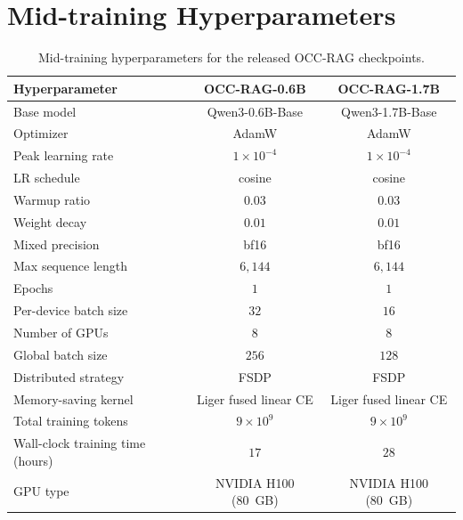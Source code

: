 \documentclass{llmxive}
\begin{document}


% 

% 
\section{Mid-training Hyperparameters}
\label{appendix:training-hyperparameters}
\begin{table}[!htbp]
\centering
\small
\begin{tabular}{lcc}
\toprule
\textbf{Hyperparameter} & \textbf{OCC-RAG-0.6B} & \textbf{OCC-RAG-1.7B} \\
\midrule
Base model              & Qwen3-0.6B-Base   & Qwen3-1.7B-Base   \\
Optimizer               & AdamW             & AdamW             \\
Peak learning rate      & $1\times10^{-4}$  & $1\times10^{-4}$  \\
LR schedule             & cosine            & cosine            \\
Warmup ratio            & $0.03$            & $0.03$            \\
Weight decay            & $0.01$            & $0.01$            \\
Mixed precision         & bf16              & bf16              \\
Max sequence length     & $6{,}144$         & $6{,}144$         \\
Epochs                  & $1$               & $1$               \\
Per-device batch size   & $32$              & $16$              \\
Number of GPUs          & $8$               & $8$               \\
Global batch size       & $256$             & $128$             \\
Distributed strategy    & FSDP              & FSDP              \\
Memory-saving kernel    & Liger fused linear CE & Liger fused linear CE \\
Total training tokens   & $9\times10^9$     & $9\times10^9$               \\
Wall-clock training time (hours) & $17$              & $28$               \\
GPU type                & NVIDIA H100 (80~GB) & NVIDIA H100 (80~GB)               \\
\bottomrule
\end{tabular}
\caption{Mid-training hyperparameters for the released OCC-RAG checkpoints.}
\label{tab:training-hyperparameters}
\end{table}
\end{document}
